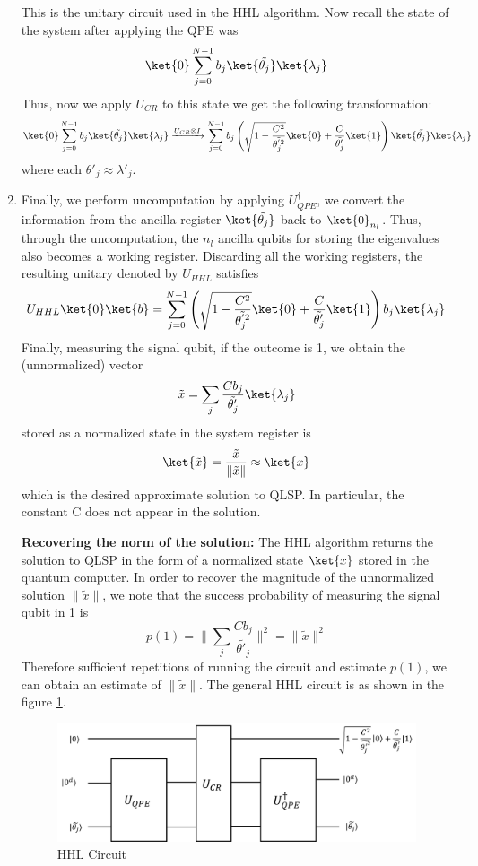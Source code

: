 \documentclass[12pt, oneside]{book}
\theoremstyle{definition}
\theoremstyle{definition}
\theoremstyle{remark}
\begin{document}
\begin{enumerate}
\[    \]
    This is the unitary circuit used in the HHL algorithm.
    Now recall the state of the system after applying the QPE was
    \[
    \ket{0}\sum_{j=0}^{N-1}b_j\ket{\tilde{\theta_j}}\ket{\lambda_j}
    \]
    Thus, now we apply $U_{CR}$ to this state we get the following transformation:
    \[
    \ket{0}\sum_{j=0}^{N-1}b_j\ket{\tilde{\theta_j}}\ket{\lambda_j}\xrightarrow{U_{CR} \otimes I} \sum_{j=0}^{N-1} b_j \left(\sqrt{1-\frac{C^2}{\tilde{\theta^{'2}_j}}}\ket{0}+\frac{C}{\tilde{\theta_j'}}\ket{1}\right)\ket{\tilde{\theta_j}}\ket{\lambda_j}
    \]
    where each $\theta'_j \approx \lambda'_j$.
    \item Finally, we perform uncomputation by applying $U^{\dagger}_{QPE}$, we convert the information from the ancilla register $\ket{\tilde{\theta_j}}$ back to $\ket{0}_{n_l}$. Thus, through the uncomputation, the $n_l$ ancilla qubits for storing the eigenvalues also becomes a working register. Discarding all the working registers, the resulting unitary denoted by $U_{HHL}$ satisfies
    \[
    U_{HHL}\ket{0}\ket{b}=\sum_{j=0}^{N-1} \left(\sqrt{1-\frac{C^2}{\tilde{\theta^{'2}_j}}}\ket{0}+\frac{C}{\tilde{\theta_j'}}\ket{1}\right)b_j\ket{\lambda_j}
    \]
    Finally, measuring the signal qubit, if the outcome is 1, we obtain the (unnormalized) vector
    \[
    \tilde{x}=\sum_j\frac{Cb_j}{\tilde{\theta'_j}}\ket{\lambda_j}
    \]
    stored as a normalized state in the system register is
    \[
    \ket{\tilde{x}}=\frac{\tilde{x}}{\|\tilde{x}\|}\approx \ket{x}
    \]
    which is the desired approximate solution to QLSP. In particular, the constant C does not appear in the solution.

   \textbf{Recovering the norm of the solution: } The HHL algorithm returns the solution to QLSP in the form of a normalized state $\ket{x}$ stored in the quantum computer. In order to recover the magnitude of the unnormalized solution $\|\tilde{x}\|$, we note that the success probability of measuring the signal qubit in 1 is
   \[
   p(1)=\|\sum_j\frac{Cb_j}{\tilde{\theta'_j}}\|^2=\|\tilde{x}\|^2
   \]
   Therefore sufficient repetitions of running the circuit and estimate $p(1)$, we can obtain an estimate of $\|\tilde{x}\|$.
    The general HHL circuit is as shown in the figure \ref{fig:hhl}.
    \begin{figure}
        \centering
        \includegraphics[width=\linewidth]{../images/Hhl.png}
        \caption{HHL Circuit}
        \label{fig:hhl}
    \end{figure}
\end{enumerate}
\end{document}
